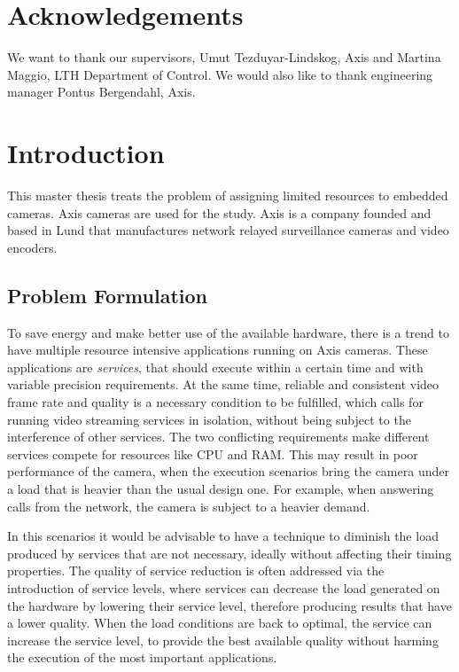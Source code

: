 \documentclass[nobiblatex]{LTHthesis}
\begin{document}
\chapter*{Acknowledgements}

We want to thank our supervisors, Umut Tezduyar-Lindskog, Axis and Martina 
Maggio, LTH Department of Control. We would also like to thank engineering 
manager Pontus Bergendahl, Axis.


\tableofcontents
\newpage

\setcounter{page}{1}

\chapter{Introduction}

This master thesis treats the problem of assigning limited resources to
embedded cameras. Axis cameras are used for the study. Axis is a company
founded and based in Lund that manufactures network relayed surveillance
cameras and video encoders.

\section{Problem Formulation}

To save energy and make better use of the available hardware, there is a
trend to have multiple resource intensive applications running on Axis
cameras. These applications are \emph{services}, that should execute within
a certain time and with variable precision requirements. At the same time,
reliable and consistent video frame rate and quality is a necessary
condition to be fulfilled, which calls for running video streaming
services in isolation, without being subject to the interference of
other services. The two conflicting requirements make different services 
compete for resources like CPU and RAM. This may result in poor performance 
of the camera, when the execution scenarios bring the camera under a load
that is heavier than the usual design one. For example, when answering calls
from the network, the camera is subject to a heavier demand. 

In this scenarios it would be advisable to have a technique to diminish
the load produced by services that are not necessary, ideally without
affecting their timing properties. The quality of service reduction is
often addressed via the introduction of service levels, where services can
decrease the load generated on the hardware by lowering their service level,
therefore producing results that have a lower quality. When the load
conditions are back to optimal, the service can increase the service level,
to provide the best available quality without harming the execution of the
most important applications.
\end{document}
